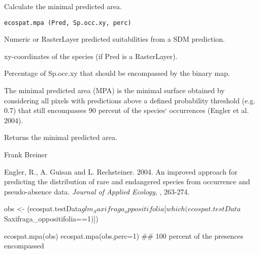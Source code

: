 \documentclass[a4paper]{book}
\begin{document}
%
\begin{Description}\relax
Calculate the minimal predicted area.
\end{Description}
%
\begin{Usage}
\begin{verbatim}
ecospat.mpa (Pred, Sp.occ.xy, perc)
\end{verbatim}
\end{Usage}
%
\begin{Arguments}
\begin{ldescription}
\item[\code{Pred}] Numeric or RasterLayer predicted suitabilities from a SDM prediction.
\item[\code{Sp.occ.xy}] xy-coordinates of the species (if Pred is a RasterLayer).
\item[\code{perc}] Percentage of Sp.occ.xy that should be encompassed by the binary map.

\end{ldescription}
\end{Arguments}
%
\begin{Details}\relax
The minimal predicted area (MPA) is the minimal surface obtained by considering all pixels with predictions above a defined probability threshold (e.g. 0.7) that still encompasses 90 percent of the species` occurrences (Engler et al. 2004).
\end{Details}
%
\begin{Value}
Returns the minimal predicted area.
\end{Value}
%
\begin{Author}\relax
Frank Breiner 
\end{Author}
%
\begin{References}\relax
Engler, R., A. Guisan and L. Rechsteiner. 2004. An improved approach for predicting the distribution of rare and endangered species from occurrence and pseudo-absence data. \emph{Journal of Applied Ecology}, , 263-274.
\end{References}
%
\begin{Examples}
\begin{ExampleCode}
obs <- (ecospat.testData$glm_Saxifraga_oppositifolia
[which(ecospat.testData$Saxifraga_oppositifolia==1)])

ecospat.mpa(obs)
ecospat.mpa(obs,perc=1) ## 100 percent of the presences encompassed
\end{ExampleCode}
\end{Examples}
\end{document}
